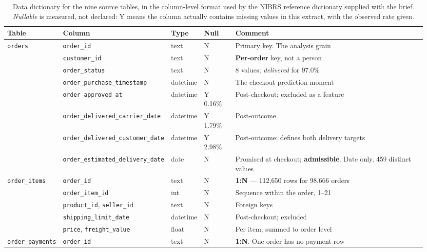 \documentclass[11pt,a4paper]{article}
\newcommand{\code}[1]{\texttt{\small #1}}
\begin{document}
\begin{table}[htbp]
\centering
\caption{Data dictionary for the nine source tables, in the column-level format
used by the NIBRS reference dictionary supplied with the brief. \emph{Nullable}
is measured, not declared: Y means the column actually contains missing values
in this extract, with the observed rate given.}
\label{tab:dictionary}
\scriptsize
\setlength{\tabcolsep}{3.5pt}
\renewcommand{\code}[1]{\texttt{#1}}
\begin{tabular}{@{}p{2.05cm}p{4.5cm}p{1.15cm}p{1.05cm}p{5.75cm}@{}}
\toprule
\textbf{Table} & \textbf{Column} & \textbf{Type} & \textbf{Null} & \textbf{Comment} \\
\midrule
\code{orders} & \code{order\_id} & text & N & Primary key. The analysis grain \\
 & \code{customer\_id} & text & N & \textbf{Per-order} key, not a person \\
 & \code{order\_status} & text & N & 8 values; \emph{delivered} for 97.0\% \\
 & \code{order\_purchase\_timestamp} & datetime & N & The checkout prediction moment \\
 & \code{order\_approved\_at} & datetime & Y 0.16\% & Post-checkout; excluded as a feature \\
 & \code{order\_delivered\_carrier\_date} & datetime & Y 1.79\% & Post-outcome \\
 & \code{order\_delivered\_customer\_date} & datetime & Y 2.98\% & Post-outcome; defines both delivery targets \\
 & \code{order\_estimated\_delivery\_date} & date & N & Promised at checkout; \textbf{admissible}. Date only, 459 distinct values \\
\midrule
\code{order\_items} & \code{order\_id} & text & N & \textbf{1:N} --- 112,650 rows for 98,666 orders \\
 & \code{order\_item\_id} & int & N & Sequence within the order, 1--21 \\
 & \code{product\_id}, \code{seller\_id} & text & N & Foreign keys \\
 & \code{shipping\_limit\_date} & datetime & N & Post-checkout; excluded \\
 & \code{price}, \code{freight\_value} & float & N & Per item; summed to order level \\
\midrule
\code{order\_payments} & \code{order\_id} & text & N & \textbf{1:N}. One order has no payment row \\

\end{tabular}
\end{table}
\end{document}
